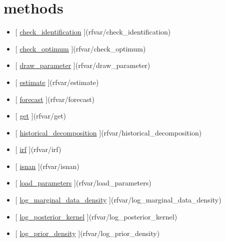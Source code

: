 \documentclass[letterpaper,10pt,english]{sphinxmanual}
\begin{document}
\section{methods}
\label{classes/models/@rfvar/rfvar:methods}\begin{itemize}
\item {} 
{[} {\hyperref[classes/models/@rfvar/rfvar:check-identification]{check\_identification}} {]}(rfvar/check\_identification)

\item {} 
{[} {\hyperref[classes/models/@rfvar/rfvar:check-optimum]{check\_optimum}} {]}(rfvar/check\_optimum)

\item {} 
{[} {\hyperref[classes/models/@rfvar/rfvar:draw-parameter]{draw\_parameter}} {]}(rfvar/draw\_parameter)

\item {} 
{[} {\hyperref[classes/models/@rfvar/rfvar:estimate]{estimate}} {]}(rfvar/estimate)

\item {} 
{[} {\hyperref[classes/models/@rfvar/rfvar:forecast]{forecast}} {]}(rfvar/forecast)

\item {} 
{[} {\hyperref[classes/models/@rfvar/rfvar:get]{get}} {]}(rfvar/get)

\item {} 
{[} {\hyperref[classes/models/@rfvar/rfvar:historical-decomposition]{historical\_decomposition}} {]}(rfvar/historical\_decomposition)

\item {} 
{[} {\hyperref[classes/models/@rfvar/rfvar:irf]{irf}} {]}(rfvar/irf)

\item {} 
{[} {\hyperref[classes/models/@rfvar/rfvar:isnan]{isnan}} {]}(rfvar/isnan)

\item {} 
{[} {\hyperref[classes/models/@rfvar/rfvar:load-parameters]{load\_parameters}} {]}(rfvar/load\_parameters)

\item {} 
{[} {\hyperref[classes/models/@rfvar/rfvar:log-marginal-data-density]{log\_marginal\_data\_density}} {]}(rfvar/log\_marginal\_data\_density)

\item {} 
{[} {\hyperref[classes/models/@rfvar/rfvar:log-posterior-kernel]{log\_posterior\_kernel}} {]}(rfvar/log\_posterior\_kernel)

\item {} 
{[} {\hyperref[classes/models/@rfvar/rfvar:log-prior-density]{log\_prior\_density}} {]}(rfvar/log\_prior\_density)


\end{itemize}
\end{document}
